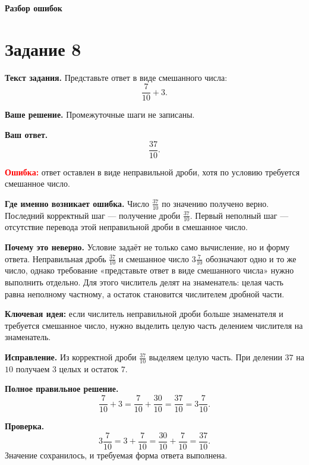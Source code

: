 \documentclass[12pt,a4paper]{article}
\begin{document}
\newpage
\thispagestyle{empty}
\vspace*{\fill}
\begin{center}
{\LARGE\bfseries Разбор ошибок}
\end{center}
\vspace*{\fill}

\newpage
{}\label{task:8}
\section*{Задание 8}

\textbf{Текст задания.}
Представьте ответ в виде смешанного числа:
\[
\frac{7}{10}+3.
\]

\textbf{Ваше решение.}
Промежуточные шаги не записаны.

\textbf{Ваш ответ.}
\[
\frac{37}{10}.
\]

\textcolor{red}{\textbf{Ошибка:}} ответ оставлен в виде неправильной дроби, хотя по условию требуется смешанное число.

\textbf{Где именно возникает ошибка.}
Число $\frac{37}{10}$ по значению получено верно. Последний корректный шаг --- получение дроби $\frac{37}{10}$. Первый неполный шаг --- отсутствие перевода этой неправильной дроби в смешанное число.

\textbf{Почему это неверно.}
Условие задаёт не только само вычисление, но и форму ответа. Неправильная дробь $\frac{37}{10}$ и смешанное число $3\frac{7}{10}$ обозначают одно и то же число, однако требование «представьте ответ в виде смешанного числа» нужно выполнить отдельно. Для этого числитель делят на знаменатель: целая часть равна неполному частному, а остаток становится числителем дробной части.

\textcolor{blue!60!black}{\textbf{Ключевая идея:}} если числитель неправильной дроби больше знаменателя и требуется смешанное число, нужно выделить целую часть делением числителя на знаменатель.

\textbf{Исправление.}
Из корректной дроби $\frac{37}{10}$ выделяем целую часть. При делении $37$ на $10$ получаем $3$ целых и остаток $7$.

\textbf{Полное правильное решение.}
\[
\frac{7}{10}+3=\frac{7}{10}+\frac{30}{10}=\frac{37}{10}=3\frac{7}{10}.
\]

\textbf{Проверка.}
\[
3\frac{7}{10}=3+\frac{7}{10}=\frac{30}{10}+\frac{7}{10}=\frac{37}{10}.
\]
Значение сохранилось, и требуемая форма ответа выполнена.
\end{document}
